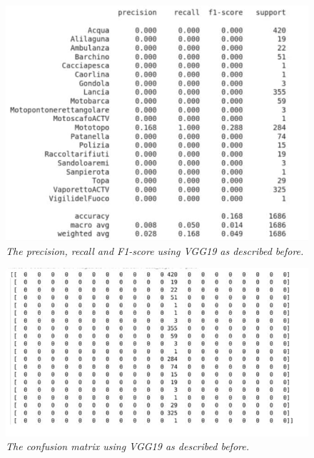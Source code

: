 \documentclass[12pt,a4paper]{report}
\begin{document}
\begin{figure}[H]
\centering
\includegraphics[scale=0.7]{./immagini/vgg19/0_data_augmentation_-_3_patience_stopping_-_dropout_0p5_-_no_batch_norm/f1.JPEG}
\caption{\textit{The precision, recall and F1-score using VGG19 as described before.}}
\end{figure}
\begin{figure}[H]
\centering
\includegraphics[scale=0.8]{./immagini/vgg19/0_data_augmentation_-_3_patience_stopping_-_dropout_0p5_-_no_batch_norm/cm_num.JPEG}
\caption{\textit{The confusion matrix using VGG19 as described before.}}
\end{figure}
\end{document}
